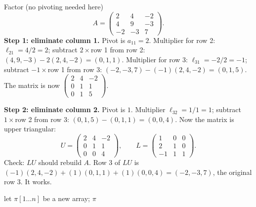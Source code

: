 \begin{example}
\label{ch27:lu-example}
Factor (no pivoting needed here)
$$
A=\begin{pmatrix}2 & 4 & -2\\ 4 & 9 & -3\\ -2 & -3 & 7\end{pmatrix}.
$$
\textbf{Step 1: eliminate column 1.} Pivot is $a_{11}=2$.
Multiplier for row 2: $\ell_{21}=4/2=2$; subtract $2\times$row 1 from row 2:
$(4,9,-3)-2(2,4,-2)=(0,1,1)$.
Multiplier for row 3: $\ell_{31}=-2/2=-1$; subtract $-1\times$row 1 from row 3:
$(-2,-3,7)-(-1)(2,4,-2)=(0,1,5)$.
The matrix is now $\begin{pmatrix}2&4&-2\\0&1&1\\0&1&5\end{pmatrix}$.

\textbf{Step 2: eliminate column 2.} Pivot is $1$. Multiplier
$\ell_{32}=1/1=1$; subtract $1\times$row 2 from row 3:
$(0,1,5)-(0,1,1)=(0,0,4)$. Now the matrix is upper triangular:
$$
U=\begin{pmatrix}2 & 4 & -2\\ 0 & 1 & 1\\ 0 & 0 & 4\end{pmatrix},\qquad
L=\begin{pmatrix}1 & 0 & 0\\ 2 & 1 & 0\\ -1 & 1 & 1\end{pmatrix}.
$$
Check: $LU$ should rebuild $A$. Row 3 of $LU$ is
$(-1)(2,4,-2)+(1)(0,1,1)+(1)(0,0,4)=(-2,-3,7)$, the original row 3. It works.
\end{example}

\begin{algorithm}[H]
\caption{\textsc{LUP-Decomposition}$(A)$}
let $\pi[1\ldots n]$ be a new array; 
\Return $\pi$\;
\end{algorithm}

